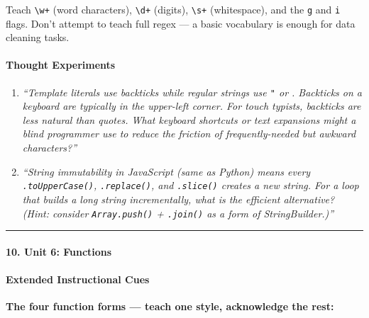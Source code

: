\documentclass[
  justified,
  openright,
]{tufte-book}
\let\subsection\paragraph
\let\paragraph\paragraph
\let\subsection\paragraph
\let\paragraph\paragraph
\begin{document}
Teach \texttt{\textbackslash{}w+} (word characters),
\texttt{\textbackslash{}d+} (digits), \texttt{\textbackslash{}s+}
(whitespace), and the \texttt{g} and \texttt{i} flags. Don't attempt to
teach full regex --- a basic vocabulary is enough for data cleaning
tasks.

\paragraph{Thought Experiments}\label{thought-experiments-24}

\begin{enumerate}
\def\labelenumi{\arabic{enumi}.}
\item
  \emph{``Template literals use backticks \texttt{\textasciigrave{}}
  while regular strings use \texttt{"} or \texttt{\textquotesingle{}}.
  Backticks on a keyboard are typically in the upper-left corner. For
  touch typists, backticks are less natural than quotes. What keyboard
  shortcuts or text expansions might a blind programmer use to reduce
  the friction of frequently-needed but awkward characters?''}
\item
  \emph{``String immutability in JavaScript (same as Python) means every
  \texttt{.toUpperCase()}, \texttt{.replace()}, and \texttt{.slice()}
  creates a new string. For a loop that builds a long string
  incrementally, what is the efficient alternative? (Hint: consider
  \texttt{Array.push()} + \texttt{.join()} as a form of
  StringBuilder.)''}
\end{enumerate}

\begin{center}\rule{0.5\linewidth}{0.5pt}\end{center}

\subsection{10. Unit 6: Functions}\label{unit-6-functions-2}

\subsection{Extended Instructional
Cues}\label{extended-instructional-cues-4}

\textbf{The four function forms --- teach one style, acknowledge the
rest:}
\end{document}
